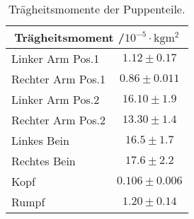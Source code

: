 \begin{table}[ht]
	\centering
	\begin{tabular}{lc}
	\toprule
	\multicolumn{2}{c}{Trägheitsmoment /$10^{-5}\cdot\si{\kilo\gram\meter\squared}$}\\
	\midrule
	Linker Arm Pos.1 &$1.12\pm0.17$\\
	Rechter Arm Pos.1 &$0.86\pm0.011$\\
	Linker Arm Pos.2 &$16.10\pm1.9$\\
	Rechter Arm Pos.2 &$13.30\pm1.4$\\
	Linkes Bein&$16.5\pm1.7$\\
	Rechtes Bein&$17.6\pm2.2$\\
	Kopf&$0.106\pm0.006$\\
	Rumpf&$1.20\pm0.14$\\
	\bottomrule
	\end{tabular}
	\caption{Trägheitsmomente der Puppenteile.}
	\label{tab:M8 Tragheit}	
\end{table}
